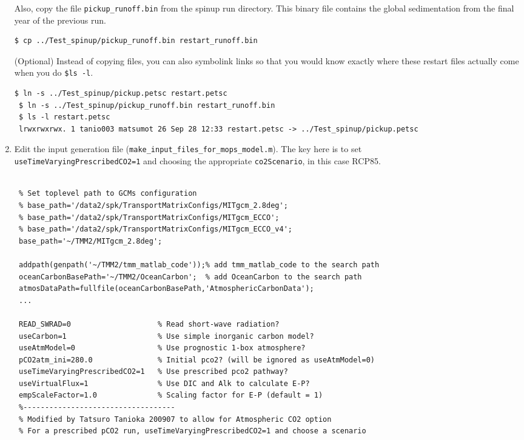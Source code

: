 \documentclass[a4paper]{article}
\def\noin{\noindent }
\begin{document}
\begin{enumerate}
\noin Also, copy the file \verb|pickup_runoff.bin| from the spinup run directory. This binary file contains the global sedimentation from the final year of the previous run.
\begin{lstlisting}[style=DOS]
 $ cp ../Test_spinup/pickup_runoff.bin restart_runoff.bin
\end{lstlisting}

\noin (Optional) Instead of copying files, you can also symbolink links so that you would know exactly where these restart files actually come when you do \verb|$ls -l|.
\begin{lstlisting}[style=DOS]
 $ ln -s ../Test_spinup/pickup.petsc restart.petsc
 $ ln -s ../Test_spinup/pickup_runoff.bin restart_runoff.bin
 $ ls -l restart.petsc
 lrwxrwxrwx. 1 tanio003 matsumot 26 Sep 28 12:33 restart.petsc -> ../Test_spinup/pickup.petsc
\end{lstlisting}

\item Edit the input generation file (\verb|make_input_files_for_mops_model.m|). The key here is to set \\ \verb|useTimeVaryingPrescribedCO2=1| and choosing the appropriate \verb|co2Scenario|, in this case RCP85. 
\lstset{language=matlab} 
\begin{lstlisting}[frame=single,basicstyle=\scriptsize,commentstyle=\color{blue}]
 % make_input_files_for_mops_model.m
 
 % Set toplevel path to GCMs configuration
 % base_path='/data2/spk/TransportMatrixConfigs/MITgcm_2.8deg';
 % base_path='/data2/spk/TransportMatrixConfigs/MITgcm_ECCO';
 % base_path='/data2/spk/TransportMatrixConfigs/MITgcm_ECCO_v4';
 base_path='~/TMM2/MITgcm_2.8deg';
 
 addpath(genpath('~/TMM2/tmm_matlab_code'));% add tmm_matlab_code to the search path
 oceanCarbonBasePath='~/TMM2/OceanCarbon';  % add OceanCarbon to the search path
 atmosDataPath=fullfile(oceanCarbonBasePath,'AtmosphericCarbonData');
 ...
  
 READ_SWRAD=0                    % Read short-wave radiation?
 useCarbon=1                     % Use simple inorganic carbon model?
 useAtmModel=0                   % Use prognostic 1-box atmosphere?
 pCO2atm_ini=280.0               % Initial pco2? (will be ignored as useAtmModel=0)
 useTimeVaryingPrescribedCO2=1   % Use prescribed pco2 pathway?
 useVirtualFlux=1                % Use DIC and Alk to calculate E-P?
 empScaleFactor=1.0              % Scaling factor for E-P (default = 1)
 %-----------------------------------
 % Modified by Tatsuro Tanioka 200907 to allow for Atmospheric CO2 option
 % For a prescribed pCO2 run, useTimeVaryingPrescribedCO2=1 and choose a scenario
 

\end{lstlisting}
\end{enumerate}
\end{document}
